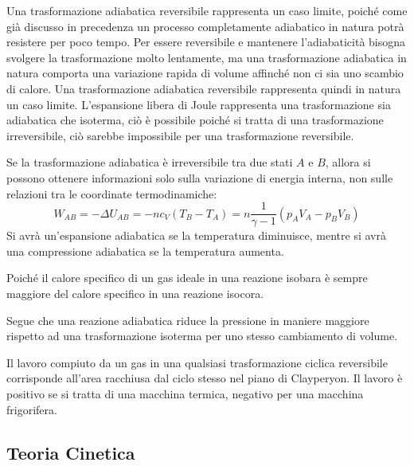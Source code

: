 \documentclass{article}
\numberwithin{equation}{subsection}
\begin{document}
Una trasformazione adiabatica reversibile rappresenta un caso limite, poiché come già discusso in precedenza un processo completamente adiabatico in natura potrà resistere 
per poco tempo. Per essere reversibile e mantenere l'adiabaticità bisogna svolgere la trasformazione molto lentamente, ma una trasformazione adiabatica in natura comporta una variazione rapida di 
volume affinché non ci sia uno scambio di calore. Una trasformazione adiabatica reversibile rappresenta quindi in natura un caso limite. L'espansione libera di Joule rappresenta 
una trasformazione sia adiabatica che isoterma, ciò è possibile poiché si tratta di una trasformazione irreversibile, ciò sarebbe impossibile per una trasformazione reversibile. 


Se la trasformazione adiabatica è irreversibile tra due stati $A$ e $B$, allora si possono ottenere informazioni solo sulla variazione di energia interna, non sulle 
relazioni tra le coordinate termodinamiche:
\begin{equation*}
    W_{AB}=-\Delta U_{AB}=-nc_V(T_B-T_A)=\displaystyle n\frac{1}{\gamma-1}(p_AV_A-p_BV_B)
\end{equation*}
Si avrà un'espansione adiabatica se la temperatura diminuisce, mentre si avrà una compressione adiabatica se la temperatura aumenta. 


Poiché il calore 
specifico di un gas ideale in una reazione isobara è sempre 
maggiore del calore specifico in una reazione isocora. 


Segue che 
una reazione adiabatica riduce la pressione in maniere maggiore 
rispetto ad una trasformazione isoterma per uno stesso 
cambiamento di volume.


Il lavoro compiuto da un gas in una qualsiasi trasformazione ciclica reversibile corrisponde all'area racchiusa dal ciclo stesso nel piano di Clayperyon. Il lavoro è positivo 
se si tratta di una macchina termica, negativo per una macchina frigorifera. 

\subsection{Teoria Cinetica}
\end{document}
